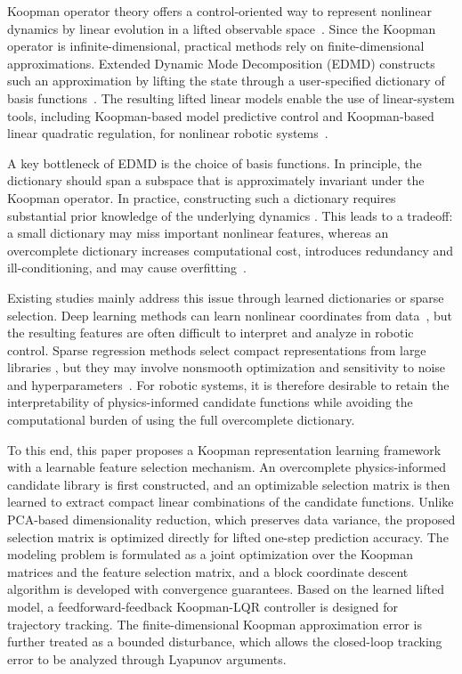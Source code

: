 \documentclass[letterpaper,10pt,conference]{ieeeconf}
\begin{document}
Koopman operator theory offers a control-oriented way to
represent nonlinear dynamics by linear evolution in a lifted observable
space~\cite{Koopman1931,Korda2018conv}. Since the Koopman operator is
infinite-dimensional, practical methods rely on finite-dimensional
approximations. Extended Dynamic Mode Decomposition (EDMD) constructs such an
approximation by lifting the state through a user-specified dictionary of basis
functions~\cite{Williams2015EDMD,Korda2018conv}. The resulting lifted linear
models enable the use of linear-system tools, including Koopman-based model
predictive control and Koopman-based linear quadratic regulation, for nonlinear
robotic systems~\cite{Proctor2016DMDc,Korda2018MPC,Brunton2016Koopman}.

A key bottleneck of EDMD is the choice of basis functions.
In principle, the dictionary should span a subspace that is approximately
invariant under the Koopman operator. In practice, constructing such a
dictionary requires substantial prior knowledge of the underlying dynamics
\cite{Mauroy2019}. This leads to a tradeoff: a small dictionary may miss
important nonlinear features, whereas an overcomplete dictionary increases
computational cost, introduces redundancy and ill-conditioning, and may cause
overfitting~\cite{Mamakoukas2021TRO,ShiKarydis2022RAL}.

Existing studies mainly address this issue through learned dictionaries or
sparse selection. Deep learning methods can learn nonlinear coordinates from
data~\cite{Lusch2018,ShiMeng2022RAL,Ren2023TMech}, but the resulting features
are often difficult to interpret and analyze in robotic control. Sparse
regression methods select compact representations from large libraries
\cite{Li2017,Zhang2022Automatica}, but they may involve nonsmooth optimization
and sensitivity to noise and hyperparameters~\cite{WangEtAl2023RAL}. For robotic
systems, it is therefore desirable to retain the interpretability of
physics-informed candidate functions while avoiding the computational burden of
using the full overcomplete dictionary.

To this end, this paper proposes a Koopman representation learning framework
with a learnable feature selection mechanism. An overcomplete
physics-informed candidate library is first constructed, and an optimizable
selection matrix is then learned to extract compact linear combinations of the
candidate functions. Unlike PCA-based dimensionality reduction, which preserves
data variance, the proposed selection matrix is optimized directly for lifted
one-step prediction accuracy. The modeling problem is formulated as a joint
optimization over the Koopman matrices and the feature selection matrix, and a
block coordinate descent algorithm is developed with convergence guarantees.
Based on the learned lifted model, a feedforward-feedback Koopman-LQR
controller is designed for trajectory tracking. The finite-dimensional Koopman
approximation error is further treated as a bounded disturbance, which allows
the closed-loop tracking error to be analyzed through Lyapunov arguments.
\end{document}
